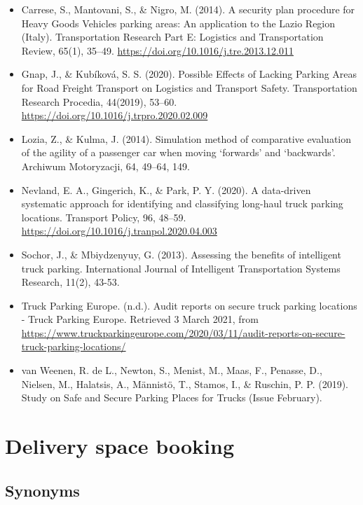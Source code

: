 \documentclass[
]{book}
\providecommand{\tightlist}{%
  \setlength{\itemsep}{0pt}\setlength{\parskip}{0pt}}
\begin{document}
\begin{itemize}
\tightlist
\item
  Carrese, S., Mantovani, S., \& Nigro, M. (2014). A security plan procedure for Heavy Goods Vehicles parking areas: An application to the Lazio Region (Italy). Transportation Research Part E: Logistics and Transportation Review, 65(1), 35--49. \url{https://doi.org/10.1016/j.tre.2013.12.011}
\item
  Gnap, J., \& Kubíková, S. S. (2020). Possible Effects of Lacking Parking Areas for Road Freight Transport on Logistics and Transport Safety. Transportation Research Procedia, 44(2019), 53--60. \url{https://doi.org/10.1016/j.trpro.2020.02.009}
\item
  Lozia, Z., \& Kulma, J. (2014). Simulation method of comparative evaluation of the agility of a passenger car when moving `forwards' and `backwards'. Archiwum Motoryzacji, 64, 49--64, 149.
\item
  Nevland, E. A., Gingerich, K., \& Park, P. Y. (2020). A data-driven systematic approach for identifying and classifying long-haul truck parking locations. Transport Policy, 96, 48--59. \url{https://doi.org/10.1016/j.tranpol.2020.04.003}
\item
  Sochor, J., \& Mbiydzenyuy, G. (2013). Assessing the benefits of intelligent truck parking. International Journal of Intelligent Transportation Systems Research, 11(2), 43-53.
\item
  Truck Parking Europe. (n.d.). Audit reports on secure truck parking locations - Truck Parking Europe. Retrieved 3 March 2021, from \url{https://www.truckparkingeurope.com/2020/03/11/audit-reports-on-secure-truck-parking-locations/}
\item
  van Weenen, R. de L., Newton, S., Menist, M., Maas, F., Penasse, D., Nielsen, M., Halatsis, A., Männistö, T., Stamos, I., \& Ruschin, P. P. (2019). Study on Safe and Secure Parking Places for Trucks (Issue February).
\end{itemize}

\hypertarget{space_book}{%
\section{Delivery space booking}\label{space_book}}

\hypertarget{synonyms-21}{%
\subsection*{Synonyms}\label{synonyms-21}}
\end{document}
